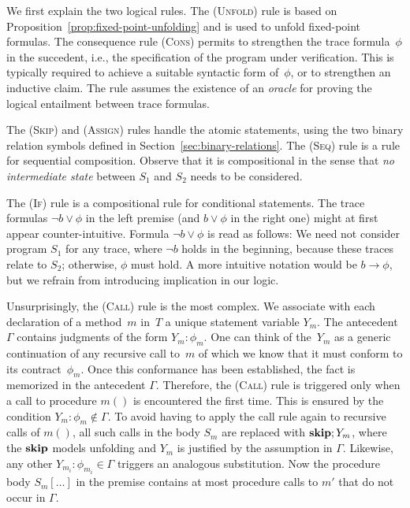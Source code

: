\documentclass[10pt,a4paper]{amsart}
\theoremstyle{definition}
\newcommand{\rh}[1]{\marginpar{RH: #1}}
\newcommand{\Skip}{\mbox{\bf skip}}
\newcommand{\judge}[2]{#1 : #2}
\begin{document}
We first explain the two logical rules.
%
The (\textsc{Unfold}) rule is based on
Proposition~\ref{prop:fixed-point-unfolding} and is used to unfold
fixed-point formulas.
%
The consequence rule (\textsc{Cons}) permits to strengthen the trace
formula~$\phi$ in the succedent, i.e., the specification of the
program under verification. This is typically required to achieve a
suitable syntactic form of~$\phi$, or to strengthen an inductive
claim.  The rule assumes the existence of an \emph{oracle} for proving
the logical entailment between trace formulas.

The (\textsc{Skip}) and (\textsc{Assign}) rules handle the atomic
statements, using the two binary relation symbols defined in
Section~\ref{sec:binary-relations}.
%
The (\textsc{Seq}) rule is a rule for sequential composition. Observe
that it is compositional in the sense that \emph{no intermediate
  state} between $S_1$ and $S_2$ needs to be considered.

The (\textsc{If}) rule is a compositional rule for conditional
statements. The trace formulas $\lnot b\lor\phi$ in the left premise
(and $b\lor\phi$ in the right one) might at first appear
counter-intuitive. Formula $\lnot b\lor\phi$ is read as follows: We
need not consider program $S_1$ for any trace, where $\lnot b$ holds
in the beginning, because these traces relate to $S_2$; otherwise,
$\phi$ must hold. A more intuitive notation would be
$b\rightarrow\phi$, but we refrain from introducing implication in our
logic.

Unsurprisingly, the (\textsc{Call}) rule is the most complex.  We
associate with each declaration of a method~$m$ in~$T$ a unique
statement variable $Y_m$. The antecedent $\Gamma$ contains judgments
of the form $\judge{Y_m}{\phi_m}$.  One can think of the~$Y_m$ as a
generic continuation of any recursive call to~$m$ of which we know
that it must conform to its contract~$\phi_m$. Once this conformance
has been established, the fact is memorized in the antecedent
$\Gamma$. Therefore, the (\textsc{Call}) rule is triggered only when a
call to procedure $m()$ is encountered the first time.  This is
ensured by the condition $\judge{Y_m}{\phi_m}\not\in\Gamma$. To avoid
having to apply the call rule again to recursive calls of $m()$, all
such calls in the body $S_m$ are replaced with $\Skip;Y_m$, where the
$\Skip$ models unfolding and $Y_m$ is justified by the assumption in
$\Gamma$. Likewise, any other $\judge{Y_{m_i}}{\phi_{m_i}}\in\Gamma$
triggers an analogous substitution. Now the procedure body
$S_m[\ldots]$ in the premise contains at most procedure calls to $m'$
that do not occur in $\Gamma$.
\end{document}
